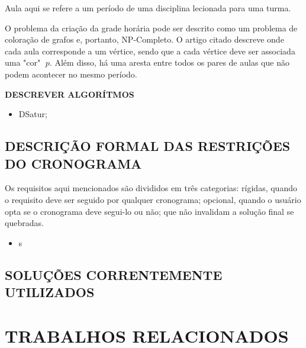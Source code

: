 \documentclass[12pt,a4paper]{article}
\begin{document}
		\par Aula aqui se refere a um período de uma disciplina lecionada para uma turma.

		\par O problema da criação da grade horária pode ser descrito como um problema de coloração de grafos \cite{complexity} e, portanto, NP-Completo. O artigo citado descreve onde cada aula corresponde a um vértice, sendo que a cada vértice deve ser associada uma "cor" $\;p$. Além disso, há uma aresta entre todos os pares de aulas que não podem acontecer no mesmo período.


		\par \textbf{DESCREVER ALGORÍTMOS}

		\begin{itemize}
			\item DSatur;
		\end{itemize}

		\subsection{DESCRIÇÃO FORMAL DAS RESTRIÇÕES DO CRONOGRAMA}

			Os requisitos aqui mencionados são divididos em três categorias: rígidas, quando o requisito deve ser seguido por qualquer cronograma; opcional, quando o usuário opta se o cronograma deve segui-lo ou não; que não invalidam a solução final se quebradas.

			\begin{itemize}
				\item s
			\end{itemize}
			\lipsum[1]

		\subsection{SOLUÇÕES CORRENTEMENTE UTILIZADOS}

			\lipsum[1]



			\lipsum[1]
	\newpage

	\section{TRABALHOS RELACIONADOS}
\end{document}
